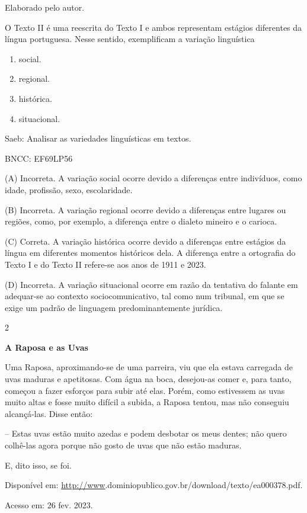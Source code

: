 Elaborado pelo autor.

O Texto II é uma reescrita do Texto I e ambos representam estágios
diferentes da língua portuguesa. Nesse sentido, exemplificam a variação
linguística

\begin{enumerate}
\def\labelenumi{\alph{enumi})}
\item
  social.
\item
  regional.
\item
  histórica.
\item
  situacional.
\end{enumerate}

Saeb: Analisar as variedades linguísticas em textos.

BNCC: EF69LP56

(A) Incorreta. A variação social ocorre devido a diferenças entre
indivíduos, como idade, profissão, sexo, escolaridade.

(B) Incorreta. A variação regional ocorre devido a diferenças entre
lugares ou regiões, como, por exemplo, a diferença entre o dialeto
mineiro e o carioca.

(C) Correta. A variação histórica ocorre devido a diferenças entre
estágios da língua em diferentes momentos históricos dela. A diferença
entre a ortografia do Texto I e do Texto II refere-se aos anos de 1911 e
2023.

(D) Incorreta. A variação situacional ocorre em razão da tentativa do
falante em adequar-se ao contexto sociocomunicativo, tal como num
tribunal, em que se exige um padrão de linguagem predominantemente
jurídica.

\num{2}

\textbf{A Raposa e as Uvas}

Uma Raposa, aproximando-se de uma parreira, viu que ela estava carregada
de uvas maduras e apetitosas. Com água na boca, desejou-as comer e, para
tanto, começou a fazer esforços para subir até elas. Porém, como
estivessem as uvas muito altas e fosse muito difícil a subida, a Raposa
tentou, mas não conseguiu alcançá-las. Disse então:

-- Estas uvas estão muito azedas e podem desbotar os meus dentes; não
quero colhê-las agora porque não gosto de uvas que não estão maduras.

E, dito isso, se foi.

Disponível em:
\url{http://www}.dominiopublico.gov.br/download/texto/ea000378.pdf.

Acesso em: 26 fev. 2023.

